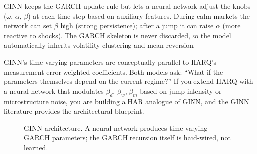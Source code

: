 \begin{intuition}
GINN keeps the GARCH update rule but lets a neural network adjust the
knobs ($\omega$, $\alpha$, $\beta$) at each time step based on auxiliary
features.  During calm markets the network can set $\beta$ high (strong
persistence); after a jump it can raise $\alpha$ (more reactive to
shocks).  The GARCH skeleton is never discarded, so the model
automatically inherits volatility clustering and mean reversion.
\end{intuition}

\begin{projectconnection}
GINN's time-varying parameters are conceptually parallel to HARQ's
measurement-error-weighted coefficients.  Both models ask: ``What if
the parameters themselves depend on the current regime?''  If you
extend HARQ with a neural network that modulates $\beta_d$, $\beta_w$,
$\beta_m$ based on jump intensity or microstructure noise, you are
building a HAR analogue of GINN, and the GINN literature provides the
architectural blueprint.
\end{projectconnection}

\begin{figure}[htbp]
\centering
{}
\caption{GINN architecture.  A neural network produces time-varying
GARCH parameters; the GARCH recursion itself is hard-wired, not learned.}
\label{fig:ginn}
\end{figure}

